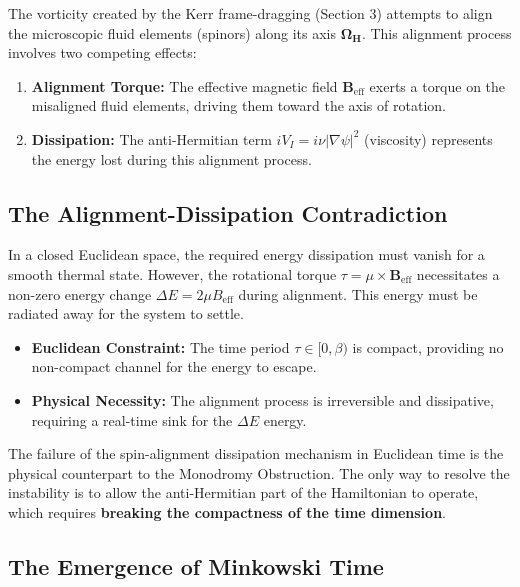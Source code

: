 \documentclass[11pt]{article}
\begin{document}
The vorticity created by the Kerr frame-dragging (Section 3) attempts to align the microscopic fluid elements (spinors) along its axis $\mathbf{\Omega_H}$. This alignment process involves two competing effects:

\begin{enumerate}
    \item \textbf{Alignment Torque:} The effective magnetic field $\mathbf{B}_{\text{eff}}$ exerts a torque on the misaligned fluid elements, driving them toward the axis of rotation.
    \item \textbf{Dissipation:} The anti-Hermitian term $iV_I = i\nu|\nabla\psi|^2$ (viscosity) represents the energy lost during this alignment process.
\end{enumerate}

\subsection{The Alignment-Dissipation Contradiction}

In a closed Euclidean space, the required energy dissipation must vanish for a smooth thermal state. However, the rotational torque $\tau = \mu \times \mathbf{B}_{\text{eff}}$ necessitates a non-zero energy change $\Delta E = 2\mu B_{\text{eff}}$ during alignment. This energy must be radiated away for the system to settle.

\begin{itemize}
    \item \textbf{Euclidean Constraint:} The time period $\tau \in [0,\beta)$ is compact, providing no non-compact channel for the energy to escape.
    \item \textbf{Physical Necessity:} The alignment process is irreversible and dissipative, requiring a real-time sink for the $\Delta E$ energy.
\end{itemize}

The failure of the spin-alignment dissipation mechanism in Euclidean time is the physical counterpart to the Monodromy Obstruction. The only way to resolve the instability is to allow the anti-Hermitian part of the Hamiltonian to operate, which requires \textbf{breaking the compactness of the time dimension}.

\subsection{The Emergence of Minkowski Time}
\end{document}
